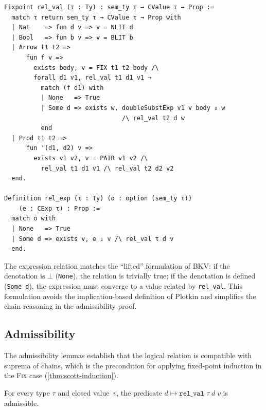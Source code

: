 \begin{lstlisting}[caption={The logical relation (\texttt{PCF\_Adequacy.v}).},
                    label={lst:rel-val}]
Fixpoint rel_val (τ : Ty) : sem_ty τ → CValue τ → Prop :=
  match τ return sem_ty τ → CValue τ → Prop with
  | Nat    => fun d v => v = NLIT d
  | Bool   => fun b v => v = BLIT b
  | Arrow t1 t2 =>
      fun f v =>
        exists body, v = FIX t1 t2 body /\
        forall d1 v1, rel_val t1 d1 v1 →
          match (f d1) with
          | None   => True
          | Some d => exists w, doubleSubstExp v1 v body ⇓ w
                                /\ rel_val t2 d w
          end
  | Prod t1 t2 =>
      fun '(d1, d2) v =>
        exists v1 v2, v = PAIR v1 v2 /\
          rel_val t1 d1 v1 /\ rel_val t2 d2 v2
  end.

Definition rel_exp (τ : Ty) (o : option (sem_ty τ))
    (e : CExp τ) : Prop :=
  match o with
  | None   => True
  | Some d => exists v, e ⇓ v /\ rel_val τ d v
  end.
\end{lstlisting}

\noindent
The expression relation matches the ``lifted'' formulation of BKV: if
the denotation is $\bot$ (\texttt{None}), the relation is trivially
true; if the denotation is defined (\texttt{Some~d}), the expression
must converge to a value related by \texttt{rel\_val}.  This
formulation avoids the implication-based definition of Plotkin
\cite{Plotkin1977} and simplifies the chain reasoning in the
admissibility proof.

\subsection*{Admissibility}

The admissibility lemmas establish that the logical relation is
compatible with suprema of chains, which is the precondition for
applying fixed-point induction in the \textsc{Fix} case
(\cref{thm:scott-induction}).

\begin{theorem}
\label{thm:mech-admissible}
For every type $\tau$ and closed value~$v$, the predicate
$d \mapsto \texttt{rel\_val}\;\tau\;d\;v$ is admissible.
\end{theorem}

